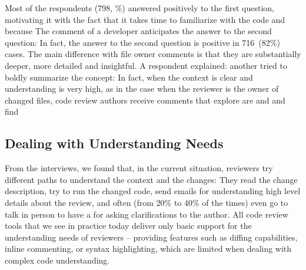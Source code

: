 Most of the respondents (798, \%) answered positively to the first question, motivating it with the fact that it takes time to familiarize with the code and  because  The comment of a developer anticipates the answer to the second question:  In fact, the answer to the second question is positive in 716~(82\%) cases. The main difference with file owner comments is that they are substantially deeper, more detailed and insightful. A respondent explained:  another tried to boldly summarize the concept: 
In fact, when the context is clear and understanding is very high, as in the case when the reviewer is the owner of changed files, code review authors receive comments that explore  are  and  and find 


\subsection{Dealing with Understanding Needs}

From the interviews, we found that, in the current situation, reviewers try different paths to understand the context and the changes: They read the change description, try to run the changed code, send emails for understanding high level details about the review, and often (from 20\% to 40\% of the times) even go to talk in person to have a  for asking clarifications to the author. All code review tools that we see in practice today deliver only basic support for the understanding needs of reviewers -- providing features such as diffing capabilities, inline commenting, or syntax highlighting, which are limited when dealing with complex code understanding.